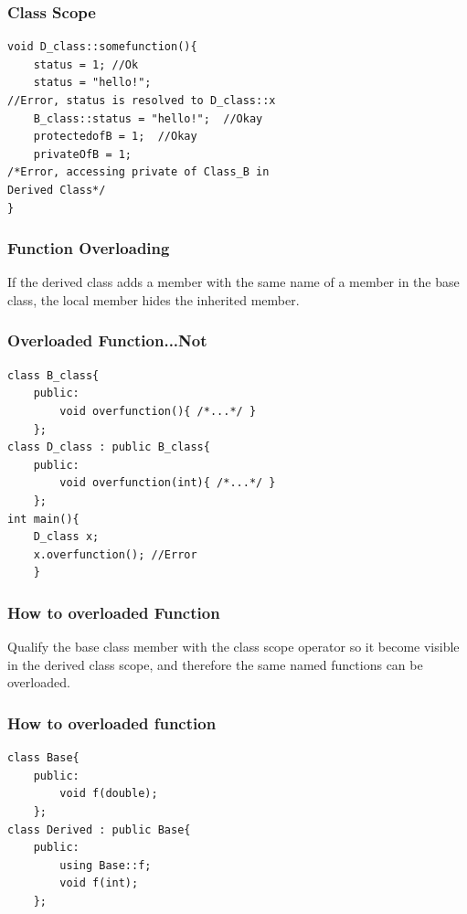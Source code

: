 \documentclass{beamer}
\newtheorem{Key points}{Key points}
\begin{document}
\begin{frame}[fragile]
\frametitle{Class Scope}
\begin{lstlisting}
void D_class::somefunction(){
	status = 1; //Ok
	status = "hello!"; 
//Error, status is resolved to D_class::x
	B_class::status = "hello!";  //Okay
	protectedofB = 1;  //Okay
	privateOfB = 1; 
/*Error, accessing private of Class_B in 
Derived Class*/
}
\end{lstlisting}
\end{frame}
\begin{frame}[fragile]
\frametitle{Function Overloading}
If the derived class adds a member with the {\color{blue}same} name of a member in the base class, the local member {\color{blue}hides} the inherited member.
\end{frame}
\begin{frame}[fragile]
\frametitle{Overloaded Function...Not}
\begin{lstlisting}
class B_class{
	public:
		void overfunction(){ /*...*/ }
	};
class D_class : public B_class{
	public:
		void overfunction(int){ /*...*/ }
	};
int main(){
	D_class x;
	x.overfunction(); //Error
	}
\end{lstlisting}
\end{frame}
\begin{frame}[fragile]
\frametitle{How to overloaded Function}
Qualify the base class member with the class scope operator so it become visible in the derived class scope, and therefore the same named functions can be overloaded.
\end{frame}
\begin{frame}[fragile]
\frametitle{How to overloaded function}
\begin{lstlisting}
class Base{
	public:
		void f(double);
	};
class Derived : public Base{
	public:
		using Base::f;
		void f(int);
	};
\end{lstlisting}
\end{frame}
\end{document}

